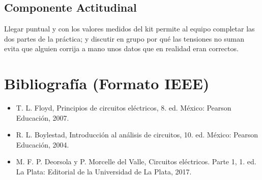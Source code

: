 \documentclass[11pt,letterpaper]{article}
\begin{document}
\subsection*{Componente Actitudinal}

\begin{cita}
Llegar puntual y con los valores medidos del kit permite al equipo completar las dos partes de la práctica; y discutir en grupo por qué las tensiones \guillemotleft{}no suman\guillemotright{} evita que alguien corrija a mano unos datos que en realidad eran correctos.
\end{cita}

\section{Bibliografía (Formato IEEE)}

{\sloppy
\begin{itemize}[leftmargin=2.6em, labelwidth=2.2em, labelsep=0.4em, align=left]
  \item[{[1]}] T. L. Floyd, Principios de circuitos eléctricos, 8.\textordfeminine{} ed. México: Pearson Educación, 2007.
  \item[{[2]}] R. L. Boylestad, Introducción al análisis de circuitos, 10.\textordfeminine{} ed. México: Pearson Educación, 2004.
  \item[{[3]}] M. F. P. Deorsola y P. Morcelle del Valle, Circuitos eléctricos. Parte 1, 1.\textordfeminine{} ed. La Plata: Editorial de la Universidad de La Plata, 2017.
\end{itemize}
}
\end{document}
